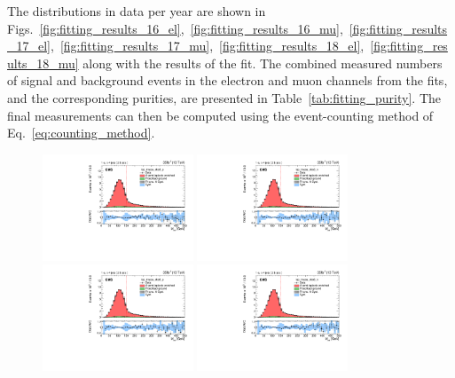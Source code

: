 The \Mlb distributions in data per year are shown in Figs.~\ref{fig:fitting_results_16_el},~\ref{fig:fitting_results_16_mu},~\ref{fig:fitting_results_17_el},~\ref{fig:fitting_results_17_mu},~\ref{fig:fitting_results_18_el},~\ref{fig:fitting_results_18_mu} along with the results of the fit.
The combined measured numbers of \ttbar signal and background events in the electron and muon channels from the fits, and the corresponding \ttbar purities, are presented in Table~\ref{tab:fitting_purity}.
The final \Acpprime measurements can then be computed using the event-counting method of Eq.~\eqref{eq:counting_method}.
\begin{figure}
    \centering
    \includegraphics[width=0.4\textwidth]{figure/FitResult_16_el_lep_tmass_obs3_p_chi2_20.pdf}
    \includegraphics[width=0.4\textwidth]{figure/FitResult_16_el_lep_tmass_obs3_n_chi2_20.pdf}
    \includegraphics[width=0.4\textwidth]{figure/FitResult_16_el_lep_tmass_obs6_p_chi2_20.pdf}
    \includegraphics[width=0.4\textwidth]{figure/FitResult_16_el_lep_tmass_obs6_n_chi2_20.pdf}

\end{figure}
